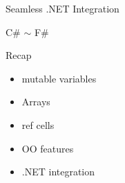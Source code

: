 \documentclass{beamer}
\begin{document}
\begin{frame}{Seamless .NET Integration}
\end{frame}

\begin{frame}{C\# $\sim$ F\#}
\end{frame}

\begin{frame}{Recap}
  \begin{itemize}[<+->]
    \item mutable variables
    \item Arrays
    \item ref cells
    \item OO features
    \item .NET integration
  \end{itemize}
\end{frame}
\end{document}
